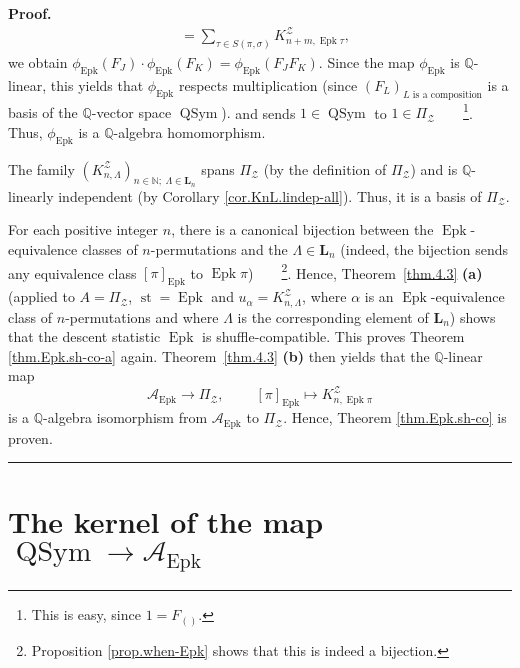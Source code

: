 \documentclass[numbers=enddot,12pt,final,onecolumn,notitlepage]{scrartcl}%
\theoremstyle{definition}
\newenvironment{proof}[1][Proof]{\noindent\textbf{#1.} }{\ \rule{0.5em}{0.5em}}
\newenvironment{verlong}{}{}
\newcommand{\NN}{\mathbb{N}}
\let\sumnonlimits\sum
\renewcommand{\sum}{\sumnonlimits\limits}
\begin{document}
\begin{verlong}
\begin{proof}
{\begin{align*}
&  =\sum_{\tau\in S\left(  \pi,\sigma\right)  }K_{n+m,\operatorname*{Epk}\tau
}^{\mathcal{Z}},
\end{align*}
we obtain $\phi_{\operatorname*{Epk}}\left(  F_{J}\right)  \cdot
\phi_{\operatorname*{Epk}}\left(  F_{K}\right)  =\phi_{\operatorname*{Epk}%
}\left(  F_{J}F_{K}\right)  $. Since the map $\phi_{\operatorname*{Epk}}$ is
$\mathbb{Q}$-linear, this yields that $\phi_{\operatorname*{Epk}}$ respects
multiplication (since $\left(  F_{L}\right)  _{L\text{ is a composition}}$ is
a basis of the $\mathbb{Q}$-vector space $\operatorname*{QSym}$).} and sends
$1\in\operatorname*{QSym}$ to $1\in\Pi_{\mathcal{Z}}$\ \ \ \ \footnote{This is
easy, since $1=F_{\left(  {}\right)  }$.}. Thus, $\phi_{\operatorname*{Epk}}$
is a $\mathbb{Q}$-algebra homomorphism.

The family $\left(  K_{n,\Lambda}^{\mathcal{Z}}\right) %
_{n \in \NN;\  \Lambda \in \mathbf{L}_n}$ spans $\Pi_{\mathcal{Z}}$ (by the
definition of $\Pi_{\mathcal{Z}}$) and is $\mathbb{Q}$-linearly independent
(by Corollary \ref{cor.KnL.lindep-all}). Thus, it is a basis of $\Pi
_{\mathcal{Z}}$.

For each positive integer $n$, there is a canonical bijection between the
$\operatorname*{Epk}$-equivalence classes of $n$-permutations and the
$\Lambda \in \mathbf{L}_n$ (indeed, the bijection sends
any equivalence class $\left[  \pi\right]  _{\operatorname*{Epk}}$ to
$\operatorname*{Epk}\pi$)\ \ \ \ \footnote{Proposition \ref{prop.when-Epk}
shows that this is indeed a bijection.}. Hence, Theorem~\ref{thm.4.3}
\textbf{(a)} (applied to $A=\Pi_{\mathcal{Z}}$, $\operatorname*{st}%
=\operatorname*{Epk}$ and $u_{\alpha}=K_{n,\Lambda}^{\mathcal{Z}}$, where
$\alpha$ is an $\operatorname*{Epk}$-equivalence class of $n$-permutations and
where $\Lambda$ is the corresponding element of $\mathbf{L}_n$)
shows that the descent statistic $\operatorname*{Epk}$ is
shuffle-compatible. This proves Theorem \ref{thm.Epk.sh-co-a} again.
Theorem~\ref{thm.4.3} \textbf{(b)} then yields that the $\mathbb{Q}$-linear
map%
\[
\mathcal{A}_{\operatorname*{Epk}}\rightarrow\Pi_{\mathcal{Z}}%
,\ \ \ \ \ \ \ \ \ \ \left[  \pi\right]  _{\operatorname*{Epk}}\mapsto
K_{n,\operatorname*{Epk}\pi}^{\mathcal{Z}}%
\]
is a $\mathbb{Q}$-algebra isomorphism from $\mathcal{A}_{\operatorname*{Epk}}$
to $\Pi_{\mathcal{Z}}$. Hence, Theorem \ref{thm.Epk.sh-co} is proven.
\end{proof}
\end{verlong}

\section{\label{sect.kernel}The kernel of the map $\operatorname*{QSym}%
\rightarrow\mathcal{A}_{\operatorname*{Epk}}$}
\end{document}
